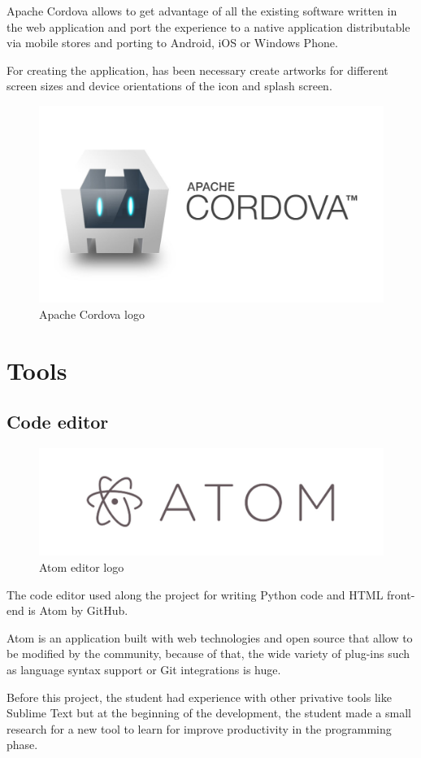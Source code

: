 \documentclass{DeustoFDP}
\begin{document}
Apache Cordova allows to get advantage of all the existing software written in the web application and port the experience to a native application distributable via mobile stores and porting to Android, iOS or Windows Phone.

For creating the application, has been necessary create artworks for different screen sizes and device orientations of the icon and splash screen.

\begin{figure}[h]
\centering
\includegraphics[width=0.4\linewidth]{fig/cordova}
\caption[Apache Cordova logo]{Apache Cordova logo}
\label{fig:cordova}
\end{figure}

\section{Tools}
\subsection{Code editor}
\begin{figure}[h]
\centering
\includegraphics[width=0.7\linewidth]{fig/atom}
\caption[Atom editor logo]{Atom editor logo}
\label{fig:atom}
\end{figure}

The code editor used along the project for writing Python code and HTML front-end is Atom by GitHub.

Atom is an application built with web technologies and open source that allow to be modified by the community, because of that, the wide variety of plug-ins such as language syntax support or Git integrations is huge.

Before this project, the student had experience with other privative tools like Sublime Text but at the beginning of the development, the student made a small research for a new tool to learn for improve productivity in the programming phase.
\end{document}
